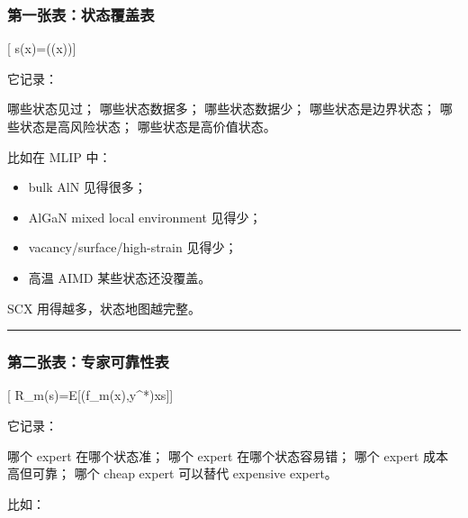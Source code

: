 \documentclass[
  12pt,
]{ctexart}
\newenvironment{Shaded}{}{}
\newcommand{\NormalTok}[1]{#1}
\providecommand{\tightlist}{%
  \setlength{\itemsep}{0pt}\setlength{\parskip}{0pt}}
\begin{document}
\subsubsection{第一张表：状态覆盖表}\label{ux7b2cux4e00ux5f20ux8868ux72b6ux6001ux8986ux76d6ux8868}

{[} s(x)=\Pi(\phi(x)){]}

它记录：

\begin{Shaded}
\begin{Highlighting}[]
\NormalTok{哪些状态见过；}
\NormalTok{哪些状态数据多；}
\NormalTok{哪些状态数据少；}
\NormalTok{哪些状态是边界状态；}
\NormalTok{哪些状态是高风险状态；}
\NormalTok{哪些状态是高价值状态。}
\end{Highlighting}
\end{Shaded}

比如在 MLIP 中：

\begin{itemize}
\tightlist
\item
  bulk AlN 见得很多；
\item
  AlGaN mixed local environment 见得少；
\item
  vacancy/surface/high-strain 见得少；
\item
  高温 AIMD 某些状态还没覆盖。
\end{itemize}

SCX 用得越多，状态地图越完整。

\begin{center}\rule{0.5\linewidth}{0.5pt}\end{center}

\subsubsection{第二张表：专家可靠性表}\label{ux7b2cux4e8cux5f20ux8868ux4e13ux5bb6ux53efux9760ux6027ux8868}

{[} R\_m(s)=\mathbb E{[}\ell(f\_m(x),y\^{}*)\mid x\in s{]}{]}

它记录：

\begin{Shaded}
\begin{Highlighting}[]
\NormalTok{哪个 expert 在哪个状态准；}
\NormalTok{哪个 expert 在哪个状态容易错；}
\NormalTok{哪个 expert 成本高但可靠；}
\NormalTok{哪个 cheap expert 可以替代 expensive expert。}
\end{Highlighting}
\end{Shaded}

比如：
\end{document}
